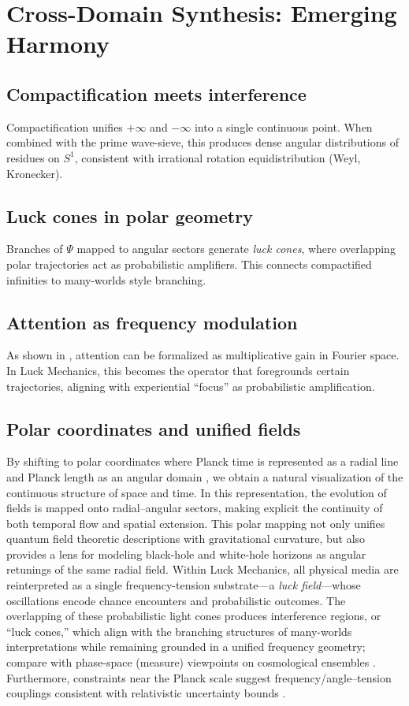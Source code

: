 \documentclass[12pt]{article}
\theoremstyle{plain}
\theoremstyle{definition}
\begin{document}
\section{Cross-Domain Synthesis: Emerging Harmony}
\subsection{Compactification meets interference}
Compactification unifies $+\infty$ and $-\infty$ into a single continuous point. When combined with the prime wave-sieve, this produces dense angular distributions of residues on $S^1$, consistent with irrational rotation equidistribution (Weyl, Kronecker).

\subsection{Luck cones in polar geometry}
Branches of $\Psi$ mapped to angular sectors generate \emph{luck cones}, where overlapping polar trajectories act as probabilistic amplifiers. This connects compactified infinities to many-worlds style branching.

\subsection{Attention as frequency modulation}
As shown in \cite{ashiru2024frequencies}, attention can be formalized as multiplicative gain in Fourier space. In Luck Mechanics, this becomes the operator that foregrounds certain trajectories, aligning with experiential ``focus'' as probabilistic amplification.

\subsection{Polar coordinates and unified fields}
By shifting to polar coordinates where Planck time is represented as a radial line and Planck length as an angular domain \citep{PlanckUnits,PolarCoords}, we obtain a natural visualization of the continuous structure of space and time. In this representation, the evolution of fields is mapped onto radial--angular sectors, making explicit the continuity of both temporal flow and spatial extension. This polar mapping not only unifies quantum field theoretic descriptions with gravitational curvature, but also provides a lens for modeling black-hole and white-hole horizons as angular retunings of the same radial field. Within Luck Mechanics, all physical media are reinterpreted as a single frequency-tension substrate---a \emph{luck field}---whose oscillations encode chance encounters and probabilistic outcomes. The overlapping of these probabilistic light cones produces interference regions, or ``luck cones,'' which align with the branching structures of many-worlds interpretations while remaining grounded in a unified frequency geometry; compare with phase-space (measure) viewpoints on cosmological ensembles \citep{GibbonsTurok2006}. Furthermore, constraints near the Planck scale suggest frequency/angle–tension couplings consistent with relativistic uncertainty bounds \citep{PhysRevResearch033343}.
\end{document}
